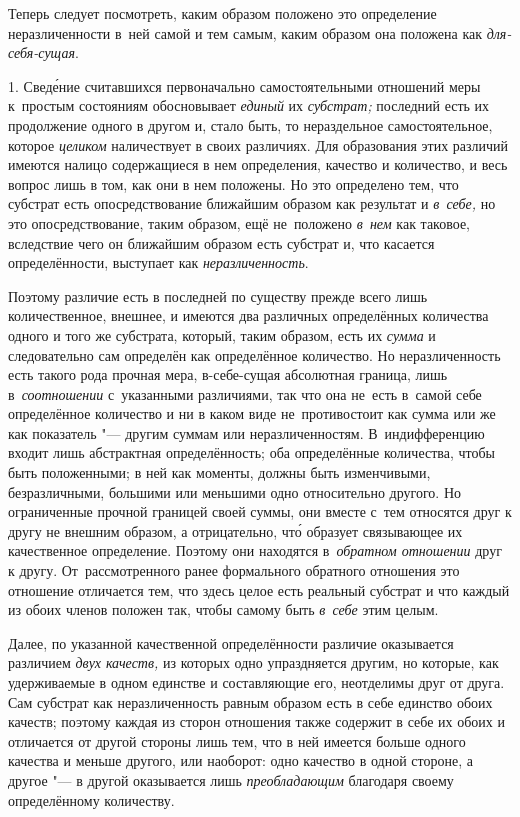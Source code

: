 
Теперь следует посмотреть, каким образом положено это определение
неразличенности в~ней самой и тем самым, каким образом она положена
как {\em для-себя-сущая}.

1. Свед\'{е}ние считавшихся первоначально самостоятельными отношений меры
к~простым состояниям обосновывает {\em единый} их {\em субстрат;} последний
есть их продолжение одного в другом и, стало быть, то нераздельное
самостоятельное, которое {\em целиком} наличествует в своих различиях.
Для образования этих различий имеются налицо содержащиеся в нем определения,
качество и количество, и весь вопрос лишь в том, как они в нем положены.
Но это определено тем, что субстрат есть опосредствование ближайшим образом
как результат и {\em в~себе,} но это опосредствование, таким образом, ещё
не~положено {\em в~нем} как таковое, вследствие чего он ближайшим образом есть
субстрат и, что касается определённости, выступает как {\em неразличенность}.

Поэтому различие есть в последней по существу прежде всего лишь количественное,
внешнее, и имеются два различных определённых количества одного и того же
субстрата, который, таким образом, есть их {\em сумма} и следовательно сам
определён как определённое количество. Но неразличенность есть такого рода
прочная мера, в-себе-сущая абсолютная граница, лишь в~{\em соотношении}
с~указанными различиями, так что она не~есть в~самой себе определённое
количество и ни в каком виде не~противостоит как сумма или же как
показатель "--- другим суммам или неразличенностям. В~индифференцию входит
лишь абстрактная определённость; оба определённые количества, чтобы быть
положенными; в ней как моменты, должны быть изменчивыми, безразличными,
большими или меньшими одно относительно другого. Но ограниченные прочной
границей своей суммы, они вместе с~тем относятся друг к другу не внешним
образом, а отрицательно, чт\'{о} образует связывающее их качественное
определение. Поэтому они находятся в~{\em обратном отношении} друг к другу.
От~рассмотренного ранее формального обратного отношения это отношение
отличается тем, что здесь целое есть реальный субстрат и что каждый из обоих
членов положен так, чтобы самому быть {\em в~себе} этим целым.

Далее, по указанной качественной определённости различие оказывается различием
{\em двух качеств,} из которых одно упраздняется другим, но которые, как
удерживаемые в одном единстве и составляющие его, неотделимы друг от друга. Сам
субстрат как неразличенность равным образом есть в себе единство обоих качеств;
поэтому каждая из сторон отношения также содержит в себе их обоих и отличается
от другой стороны лишь тем, что в ней имеется больше одного качества и меньше
другого, или наоборот: одно качество в одной стороне, а другое "--- в другой
оказывается лишь {\em преобладающим} благодаря своему определённому количеству.

